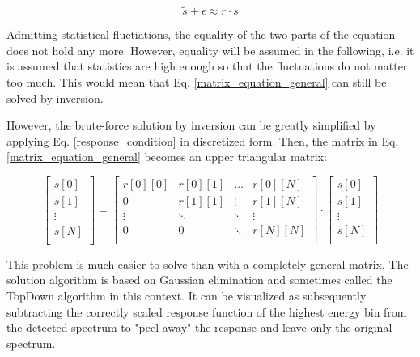 \documentclass{article}
\begin{document}
\begin{equation}
	\label{matrix_equation_statistics}
	\tilde{s} + \epsilon \approx r \cdot s
\end{equation}

Admitting statistical fluctiations, the equality of the two parts of the equation does not hold any more.
However, equality will be assumed in the following, i.e. it is assumed that statistics are high enough so that the fluctuations do not matter too much.
This would mean that Eq. \ref{matrix_equation_general} can still be solved by inversion.

However, the brute-force solution by inversion can be greatly simplified by applying Eq. \ref{response_condition} in discretized form. 
Then, the matrix in Eq. \ref{matrix_equation_general} becomes an upper triangular matrix:

\begin{equation}
	\label{matrix_equation_triangle_explicit}
	\left[ 
		\begin{array}{c}
			\tilde{s}[0] \\
			\tilde{s}[1] \\
			\vdots	\\
			\tilde{s}[N] \\
		\end{array}
	\right]
	= 
	\begin{bmatrix}
		r[0][0] & r[0][1] & \hdots & r[0][N] \\
		0       & r[1][1] & \vdots & r[1][N] \\
		\vdots  & \ddots  & \ddots & \vdots  \\
		0       & 0       & \ddots & r[N][N] \\
	\end{bmatrix}
	\cdot
	\left[ 
		\begin{array}{c}
			s[0] \\
			s[1] \\
			\vdots	\\
			s[N] \\
		\end{array}
	\right]
\end{equation}

This problem is much easier to solve than with a completely general matrix.
The solution algorithm is based on Gaussian elimination and sometimes called the TopDown algorithm in this context.
It can be visualized as subsequently subtracting the correctly scaled response function of the highest energy bin from the detected spectrum to "peel away" the response and leave only the original spectrum.
\end{document}
